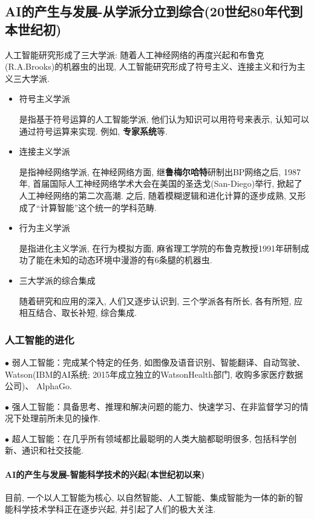 \subsection{AI的产生与发展-从学派分立到综合(20世纪80年代到本世纪初)}
人工智能研究形成了三大学派:  随着人工神经网络的再度兴起和布鲁克(R.A.Brooks)的机器虫的出现, 人工智能研究形成了符号主义、连接主义和行为主义三大学派.
\begin{itemize}
\item  符号主义学派

    是指基于符号运算的人工智能学派, 他们认为知识可以用符号来表示, 认知可以通过符号运算来实现. 例如, \textbf{专家系统}等.
\item  连接主义学派

    是指神经网络学派, 在神经网络方面, 继\textbf{鲁梅尔哈特}研制出BP网络之后, 1987年, 首届国际人工神经网络学术大会在美国的圣迭戈(San-Diego)举行, 掀起了人工神经网络的第二次高潮. 之后, 随着模糊逻辑和进化计算的逐步成熟, 又形成了“计算智能”这个统一的学科范畴.
\item  行为主义学派

    是指进化主义学派, 在行为模拟方面, 麻省理工学院的布鲁克教授1991年研制成功了能在未知的动态环境中漫游的有6条腿的机器虫.
\item  三大学派的综合集成

随着研究和应用的深入, 人们又逐步认识到, 三个学派各有所长, 各有所短, 应相互结合、取长补短, 综合集成.
\end{itemize}
\subsubsection{人工智能的进化}

$\bullet$ 弱人工智能：完成某个特定的任务, 如图像及语音识别、智能翻译、自动驾驶、 Watson(IBM的AI系统; 2015年成立独立的WatsonHealth部门, 收购多家医疗数据公司)、 AlphaGo.

$\bullet$ 强人工智能：具备思考、推理和解决问题的能力、快速学习、在非监督学习的情况下处理前所未见的操作.

$\bullet$ 超人工智能：在几乎所有领域都比最聪明的人类大脑都聪明很多, 包括科学创新、通识和社交技能.
\paragraph{AI的产生与发展-智能科学技术的兴起(本世纪初以来)}
目前, 一个以人工智能为核心, 以自然智能、人工智能、集成智能为一体的新的智能科学技术学科正在逐步兴起, 并引起了人们的极大关注.

